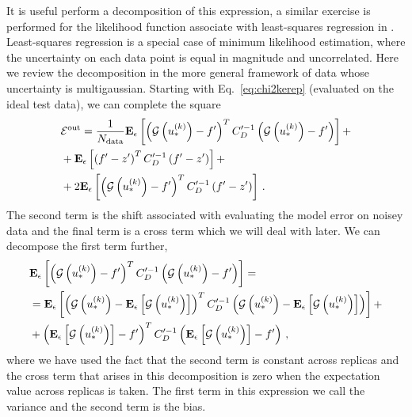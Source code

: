 It is useful perform a decomposition of this expression, a similar exercise is
performed for the likelihood function associate with least-squares regression in
\cite{mlforphysics}. Least-squares regression is a special case of minimum
likelihood estimation, where the uncertainty on each data point is equal in
magnitude and uncorrelated. Here we review the decomposition in the more general
framework of data whose uncertainty is multigaussian. Starting with
Eq.~\ref{eq:chi2kerep} (evaluated on the ideal test data), we can complete the
square
\begin{equation}
    \begin{split}
    \label{eq:EoutDecomposition}
        &\mathcal{E}^{\rm out} = \frac{1}{N_{\rm data}} \mathbf{E}_{\epsilon}\left[ 
            \left( \mathcal{G}\left(u_*^{(k)}\right) - f^\prime \right)^T
            C_D^{\prime -1}
            \left( \mathcal{G}\left(u_*^{(k)}\right) - f^\prime \right)
         \right] + \\
        &+ \mathbf{E}_{\epsilon}\left[ 
            \left( f^\prime - z^\prime \right)^T
            C_D^{\prime -1}
            \left( f^\prime - z^\prime \right)
         \right]+ \\
        &+ 2 \mathbf{E}_{\epsilon}\left[ 
            \left( \mathcal{G}\left(u_*^{(k)}\right) - f^\prime \right)^T
            C_D^{\prime -1}
            \left(f^\prime - z^\prime \right)
         \right]\, .
    \end{split}
\end{equation}
The second term is the shift associated with evaluating the model error on
noisey data and the final term is a cross term which we will deal with later. We
can decompose the first term further,
\begin{equation}
    \begin{split}
        &\mathbf{E}_{\epsilon}\left[ 
            \left( \mathcal{G}\left(u_*^{(k)}\right) - f^\prime \right)^T
            C_D^{\prime -1}
            \left( \mathcal{G}\left(u_*^{(k)}\right) - f^\prime \right)
         \right] = \\
        &= \mathbf{E}_{\epsilon}\left[ 
            \left( \mathcal{G}\left(u_*^{(k)}\right) - 
            \mathbf{E}_{\epsilon}\left[ \mathcal{G}\left(u_*^{(k)}\right) \right] \right)^T
            C_D^{\prime -1}
            \left( \mathcal{G}\left(u_*^{(k)}\right) - 
            \mathbf{E}_{\epsilon}\left[ \mathcal{G}\left(u_*^{(k)}\right) \right] \right)
         \right] + \\
        &+ \left( \mathbf{E}_{\epsilon}\left[ \mathcal{G}\left(u_*^{(k)}\right) \right] - f^\prime \right)^T
        C_D^{\prime -1}
        \left( \mathbf{E}_{\epsilon}\left[ \mathcal{G}\left(u_*^{(k)}\right) \right] - f^\prime \right)\, ,
    \end{split}
\end{equation}
where we have used the fact that the second term is constant across replicas and
the cross term that arises in this decomposition is zero when the expectation
value across replicas is taken. The first term in this expression we call the
variance and the second term is the bias.

